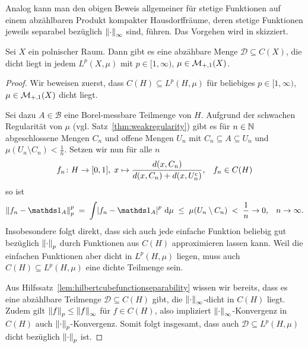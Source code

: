 \documentclass[../main/main.tex]{subfiles}
\begin{document}
	\begin{Bemerkung}
		Analog kann man den obigen Beweis allgemeiner für stetige Funktionen 
		auf einem abzählbaren Produkt kompakter Hausdorffräume, deren 
		stetige Funktionen jeweils separabel bezüglich $\left\lVert\cdot\right\rVert_\infty$ 
		sind, führen. Das Vorgehen wird in \cite[Lemma 4.12.1 und 
		Proposition 4.12.2]{Simon.2015} skizziert.
	\end{Bemerkung}

	\begin{Satz}
		Sei $X$ ein polnischer Raum. Dann gibt es eine abzähbare Menge 
		$\mathcal{D} \subseteq C(X)$, die dicht liegt in jedem 
		$L^p(X, \mu)$ mit $p \in [1, \infty)$, $\mu \in \mathcal{M}_{+,1}(X)$.
	\end{Satz}

	\begin{proof}
		Wir beweisen zuerst, dass $C(H) \subseteq L^p(H, \mu)$ für beliebiges 
		$p \in [1, \infty)$, $\mu \in \mathcal{M}_{+,1}(X)$ dicht liegt. 
		
		Sei dazu $A \in \mathcal{B}$ eine Borel-messbare Teilmenge von $H$. 
		Aufgrund der schwachen Regularität von $\mu$ (vgl. Satz~\ref{thm:weakregularity}) 
		gibt es für $n \in \mathbb{N}$ abgeschlossene Mengen $C_n$ und offene Mengen 
		$U_n$ mit $C_n \subseteq A \subseteq U_n$ und 
		$\mu(U_n \setminus C_n) < \frac{1}{n}$. Setzen wir nun für alle $n$
		\[f_n \colon H \to [0, 1], \; x \mapsto \frac{d(x, C_n)}{d(x, C_n) + 
				d(x, U_n^\mathsf{c})}  \text{,} \quad f_n \in C(H)\]
		so ist
		\[ \norm{f_n - \indfct_A}_p^p \; = \; 
			\measureint{}{\abs{f_n - \indfct_A}^p}{\mu} \; \leq \; 
			\mu(U_n \setminus C_n) \; < \; \frac{1}{n} \to 0 \text{,} 
			\quad n \to \infty \text{.}\]
		Insobesondere folgt direkt, dass sich auch jede einfache Funktion 
		beliebig gut bezüglich $\left\lVert\cdot\right\rVert_p$ durch Funktionen aus $C(H)$ 
		approximieren lassen kann. Weil die einfachen Funktionen aber dicht 
		in $L^p(H, \mu)$ liegen, muss auch $C(H) \subseteq L^p(H, \mu)$ eine 
		dichte Teilmenge sein.
		
		Aus Hilfssatz~\ref{lem:hilbertcubefunctionseparability} wissen wir 
		bereits, dass es eine abzählbare Teilmenge $\mathcal{D}\subseteq C(H)$ 
		gibt, die $\left\lVert\cdot\right\rVert_\infty$-dicht in $C(H)$ liegt. Zudem gilt 
		$\left\lVert f\right\rVert_p \leq \left\lVert f\right\rVert_\infty$ für $f \in C(H)$, also impliziert 
		$\left\lVert\cdot\right\rVert_\infty$-Konvergenz in $C(H)$ auch $\left\lVert\cdot\right\rVert_p$-Konvergenz. 
		Somit folgt insgesamt, dass auch $\mathcal{D} \subseteq L^p(H, \mu)$ dicht 
		bezüglich $\left\lVert\cdot\right\rVert_p$ ist.
		
	\end{proof}

	

	
	
\end{document}
